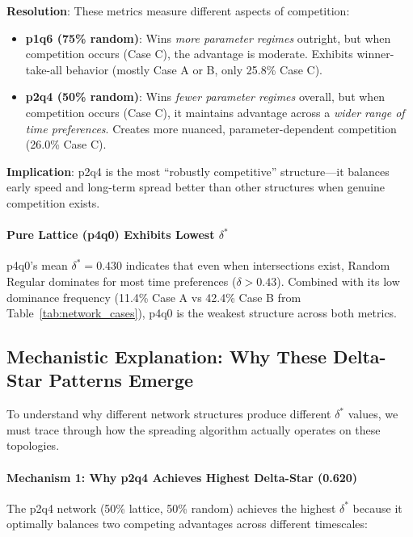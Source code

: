 \documentclass[12pt,a4paper]{article}
\begin{document}
\textbf{Resolution}: These metrics measure different aspects of competition:
\begin{itemize}
    \item \textbf{p1q6 (75\% random)}: Wins \textit{more parameter regimes} outright, but when competition occurs (Case C), the advantage is moderate. Exhibits winner-take-all behavior (mostly Case A or B, only 25.8\% Case C).
    \item \textbf{p2q4 (50\% random)}: Wins \textit{fewer parameter regimes} overall, but when competition occurs (Case C), it maintains advantage across a \textit{wider range of time preferences}. Creates more nuanced, parameter-dependent competition (26.0\% Case C).
\end{itemize}

\textbf{Implication}: p2q4 is the most ``robustly competitive'' structure---it balances early speed and long-term spread better than other structures when genuine competition exists.

\paragraph{Pure Lattice (p4q0) Exhibits Lowest $\delta^*$}

p4q0's mean $\delta^* = 0.430$ indicates that even when intersections exist, Random Regular dominates for most time preferences ($\delta > 0.43$). Combined with its low dominance frequency (11.4\% Case A vs 42.4\% Case B from Table~\ref{tab:network_cases}), p4q0 is the weakest structure across both metrics.

\subsection{Mechanistic Explanation: Why These Delta-Star Patterns Emerge}

To understand why different network structures produce different $\delta^*$ values, we must trace through how the spreading algorithm actually operates on these topologies.

\paragraph{Mechanism 1: Why p2q4 Achieves Highest Delta-Star (0.620)}

The p2q4 network (50\% lattice, 50\% random) achieves the highest $\delta^*$ because it optimally balances two competing advantages across different timescales:
\end{document}
